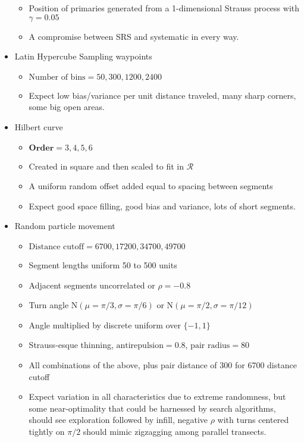\documentclass[review]{elsarticle}
\begin{document}
\begin{itemize}
\begin{itemize}
\item Position of primaries generated from a 1-dimensional Strauss process with
\(\gamma = 0.05\)
\item A compromise between SRS and systematic in every way.
\end{itemize}
\item Latin Hypercube Sampling waypoints
\begin{itemize}
\item \(\text{Number of bins} = 50, 300, 1200, 2400\)
\item Expect low bias/variance per unit distance traveled, many sharp corners,
some big open areas.
\end{itemize}
\item Hilbert curve
\begin{itemize}
\item \(\mathbf{Order} = 3, 4, 5, 6\)
\item Created in square and then scaled to fit in \(\mathcal{R}\)
\item A uniform random offset added equal to spacing between segments
\item Expect good space filling, good bias and variance, lots of short
segments.
\end{itemize}
\item Random particle movement
\begin{itemize}
\item \(\text{Distance cutoff} = 6700, 17200, 34700, 49700\)
\item Segment lengths uniform 50 to 500 units
\item Adjacent segments uncorrelated or \(\rho = -0.8\)
\item Turn angle \(\mathrm{N}(\mu = \pi / 3, \sigma = \pi / 6)\) or
\(\mathrm{N}(\mu = \pi / 2, \sigma = \pi / 12)\)
\item Angle multiplied by discrete uniform over \(\{-1, 1\}\)
\item Strauss-esque thinning, \(\text{antirepulsion} = 0.8\),
\(\text{pair radius} = 80\)
\item All combinations of the above, plus pair distance of 300 for 6700
distance cutoff
\item Expect variation in all characteristics due to extreme randomness, but
some near-optimality that could be harnessed by search algorithms, should see
exploration followed by infill, negative \(\rho\) with turns centered tightly
on \(\pi / 2\) should mimic zigzagging among parallel transects.
\end{itemize}
\end{itemize}
\end{document}
